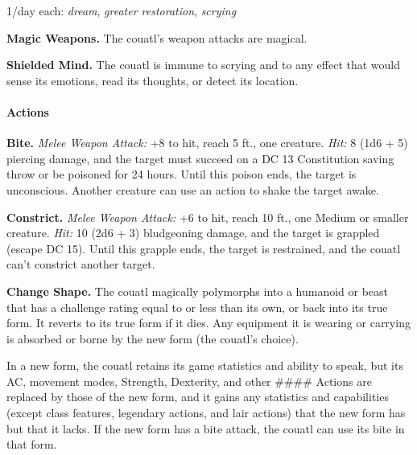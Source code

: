 \documentclass[
]{article}
\begin{document}
1/day each: \emph{dream}, \emph{greater restoration}, \emph{scrying}

\textbf{Magic Weapons.} The couatl's weapon attacks are magical.

\textbf{Shielded Mind.} The couatl is immune to scrying and to any
effect that would sense its emotions, read its thoughts, or detect its
location.

\hypertarget{actions-5}{%
\paragraph{Actions}\label{actions-5}}

\textbf{Bite.} \emph{Melee Weapon Attack:} +8 to hit, reach 5 ft., one
creature. \emph{Hit:} 8 (1d6 + 5) piercing damage, and the target must
succeed on a DC 13 Constitution saving throw or be poisoned for 24
hours. Until this poison ends, the target is unconscious. Another
creature can use an action to shake the target awake.

\textbf{Constrict.} \emph{Melee Weapon Attack:} +6 to hit, reach 10 ft.,
one Medium or smaller creature. \emph{Hit:} 10 (2d6 + 3) bludgeoning
damage, and the target is grappled (escape DC 15). Until this grapple
ends, the target is restrained, and the couatl can't constrict another
target.

\textbf{Change Shape.} The couatl magically polymorphs into a humanoid
or beast that has a challenge rating equal to or less than its own, or
back into its true form. It reverts to its true form if it dies. Any
equipment it is wearing or carrying is absorbed or borne by the new form
(the couatl's choice).

In a new form, the couatl retains its game statistics and ability to
speak, but its AC, movement modes, Strength, Dexterity, and other
\#\#\#\# Actions are replaced by those of the new form, and it gains any
statistics and capabilities (except class features, legendary actions,
and lair actions) that the new form has but that it lacks. If the new
form has a bite attack, the couatl can use its bite in that form.
\end{document}
